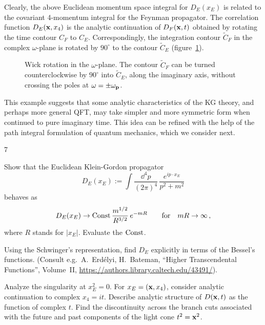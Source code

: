 Clearly, the above Euclidean momentum space integral for $D_E(x_E)$ is related
to the covariant 4-momentum integral for the Feynman propagator. The
correlation function $D_E(\mathbf{x},x_4)$ is the analytic continuation of
$D_F(\mathbf{x},t)$ obtained by rotating the time contour $C_F$ to $C_E$.
Correspondingly, the integration contour $\tilde C_F$ in the complex
$\omega$-plane is rotated by $90^\circ$ to the contour $\tilde C_E$
(figure~\ref{fig:omegaE}).
\begin{figure}[ht]
\centering{}
\caption{Wick rotation in the $\omega$-plane. The contour $\tilde C_F$ can be
turned counterclockwise by $90^\circ$ into $\tilde C_E$, along the imaginary
axis, without crossing the poles at $\omega=\pm\omega_{\mathbf{p}}$.}
\label{fig:omegaE}
\end{figure}

This example suggests that some analytic characteristics of the KG theory,
and perhaps more general QFT, may take simpler and more symmetric form when
continued to pure imaginary time. This idea can be refined with the help of
the path integral formulation of quantum mechanics, which we consider next.

\begin{hwproblem}{7}\label{hw:7}
\begin{hwparts}
\item Show that the Euclidean Klein-Gordon propagator
\[
D_E(x_E):=\int\frac{\dd^4p}{(2\pi)^4}\,\frac{e^{ip\cdot x_E}}{p^2+m^2}
\]
behaves as
\[
D_E(x_E)\to\text{Const}\,\frac{m^{1/2}}{R^{3/2}}\,e^{-mR}\qquad\text{for}\quad mR\to\infty\,,
\]
where $R$ stands for $|x_E|$. Evaluate the $\text{Const}$.
\item Using the Schwinger's representation, find $D_E$ explicitly in terms of
the Bessel's functions. (Consult e.g.\ A.~Erd\'elyi, H.~Bateman, ``Higher
Transcendental Functions'', Volume~II,
\url{https://authors.library.caltech.edu/43491/}).
\item Analyze the singularity at $x_E^2=0$. For $x_E=(\mathbf{x},x_4)$, consider
analytic continuation to complex $x_4=it$. Describe analytic structure of
$D(\mathbf{x},t)$ as the function of complex $t$. Find the discontinuity across the
branch cuts associated with the future and past components of the light cone
$t^2=\mathbf{x}^2$.
\end{hwparts}
\end{hwproblem}
